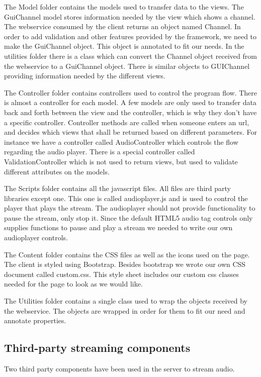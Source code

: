 \documentclass[a4paper,11pt,report]{article}
\begin{document}
The Model folder contains the models used to transfer data to the views. The GuiChannel model stores information needed by the view which shows a channel. The webservice consumed by the client returns an object named Channel. In order to add validation and other features provided by the framework, we need to make the GuiChannel object. This object is annotated to fit our needs. In the utilities folder there is a class which can convert the Channel object received from the webservice to a GuiChannel object.
There is similar objects to GUIChannel providing information needed by the different views.

The Controller folder contains controllers used to control the program flow. There is almost a controller for each model. A few models are only used to transfer data back and forth between the view and the controller, which is why they don’t have a specific controller. Controller methods are called when someone enters an url, and decides which views that shall be returned based on different parameters. For instance we have a controller called AudioController which controls the flow regarding the audio player. There is a special controller called ValidationController which is not used to return views, but used to validate different attributes on the models.

The Scripts folder contains all the javascript files. All files are third party libraries except one. This one is called audioplayer.js and is used to control the player that plays the stream. The audioplayer should not provide functionality to pause the stream, only stop it. Since the default HTML5 audio tag controls only supplies functions to pause and play a stream we needed to write our own audioplayer controls.

The Content folder contains the CSS files as well as the icons used on the page. The client is styled using Bootstrap. Besides bootstrap we wrote our own CSS document called custom.css. This style sheet includes our custom css classes needed for the page to look as we would like.

The Utilities folder contains a single class used to wrap the objects received by the webservice. The objects are wrapped in order for them to fit our need and annotate properties.

\subsection{Third-party streaming components}
Two third party components have been used in the server to stream audio.
\end{document}
